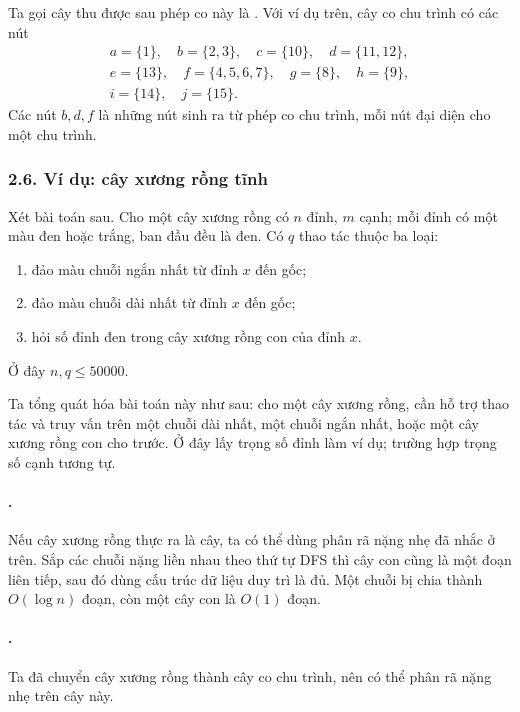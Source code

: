 \documentclass[11pt]{article}
\begin{document}
Ta gọi cây thu được sau phép co này là . Với ví dụ
trên, cây co chu trình có các nút
\[
\begin{gathered}
a=\{1\},\quad b=\{2,3\},\quad c=\{10\},\quad d=\{11,12\},\\
e=\{13\},\quad f=\{4,5,6,7\},\quad g=\{8\},\quad h=\{9\},\\
i=\{14\},\quad j=\{15\}.
\end{gathered}
\]
Các nút \(b,d,f\) là những nút sinh ra từ phép co chu trình, mỗi nút đại diện
cho một chu trình.

\subsubsection*{2.6. Ví dụ: cây xương rồng tĩnh}

Xét bài toán sau. Cho một cây xương rồng có \(n\) đỉnh, \(m\) cạnh; mỗi đỉnh
có một màu đen hoặc trắng, ban đầu đều là đen. Có \(q\) thao tác thuộc ba loại:

\begin{enumerate}
  \item đảo màu chuỗi ngắn nhất từ đỉnh \(x\) đến gốc;
  \item đảo màu chuỗi dài nhất từ đỉnh \(x\) đến gốc;
  \item hỏi số đỉnh đen trong cây xương rồng con của đỉnh \(x\).
\end{enumerate}

Ở đây \(n,q\le 50000\).

Ta tổng quát hóa bài toán này như sau: cho một cây xương rồng, cần hỗ trợ thao
tác và truy vấn trên một chuỗi dài nhất, một chuỗi ngắn nhất, hoặc một cây
xương rồng con cho trước. Ở đây lấy trọng số đỉnh làm ví dụ; trường hợp trọng
số cạnh tương tự.

\paragraph{.}
Nếu cây xương rồng thực ra là cây, ta có thể dùng phân rã nặng nhẹ đã nhắc ở
trên. Sắp các chuỗi nặng liền nhau theo thứ tự DFS thì cây con cũng là một
đoạn liên tiếp, sau đó dùng cấu trúc dữ liệu duy trì là đủ. Một chuỗi bị chia
thành \(O(\log n)\) đoạn, còn một cây con là \(O(1)\) đoạn.

\paragraph{.}
Ta đã chuyển cây xương rồng thành cây co chu trình, nên có thể phân rã nặng
nhẹ trên cây này.
\end{document}
